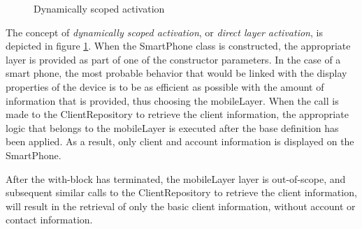 \documentclass{acm_proc_article-sp}
\begin{document}
\begin{figure}[H]
\centering
{}
\caption{Dynamically scoped activation}
\label{fig:dynamically_scoped_activation}
\end{figure}
The concept of \textit{dynamically scoped activation}, or \textit{direct layer activation}, is depicted in figure \ref{fig:dynamically_scoped_activation}. When the SmartPhone class is constructed, the appropriate layer is provided as part of one of the constructor parameters. In the case of a smart phone, the most probable behavior that would be linked with the display properties of the device is to be as efficient as possible with the amount of information that is provided, thus choosing the mobileLayer. When the call is made to the ClientRepository to retrieve the client information, the appropriate logic that belongs to the mobileLayer is executed after the base definition has been applied. As a result, only client and account information is displayed on the SmartPhone. 

After the with-block has terminated, the mobileLayer layer is out-of-scope, and subsequent similar calls to the ClientRepository to retrieve the client information, will result in the retrieval of only the basic client information, without account or contact information.








\end{document}
